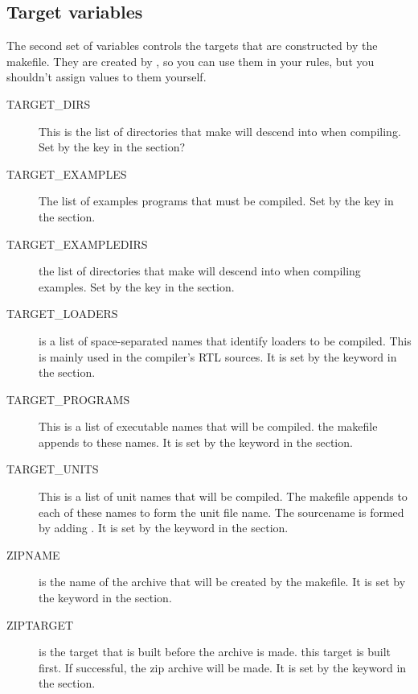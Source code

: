 {\subsection{Target variables}

The second set of variables controls the targets that are constructed
by the makefile. They are created by \fpcmake{}, so you can use
them in your rules, but you shouldn't assign values to them yourself.

\begin{description}
\item[TARGET\_DIRS] This is the list of directories that make will descend
into when compiling. Set by the  key in the  section?

\item[TARGET\_EXAMPLES] The list of examples programs that must be compiled.
Set by the  key in the  section.

\item[TARGET\_EXAMPLEDIRS] the list of directories that make will descend
into when compiling examples. Set by the  key in the 
 section.

\item[TARGET\_LOADERS] is a list of space-separated names that identify
loaders to be compiled. This is mainly used in the compiler's RTL sources.
It is set by the  keyword in the  section.

\item[TARGET\_PROGRAMS] This is a list of executable names that will be compiled.
the makefile appends  to these names. It is set by the
 keyword in the  section.

\item[TARGET\_UNITS] This is a list of unit names that will be compiled. The
makefile appends  to each of these names to form the unit file
name. The sourcename is formed by adding .
It is set by the  keyword in the  section.

\item[ZIPNAME] is the name of the archive that will be created by the
makefile.
It is set by the  keyword in the  section.

\item[ZIPTARGET] is the target that is built before the archive is made.
this target is built first. If successful, the zip archive will be made.
It is set by the  keyword in the  section.


\end{description}}
